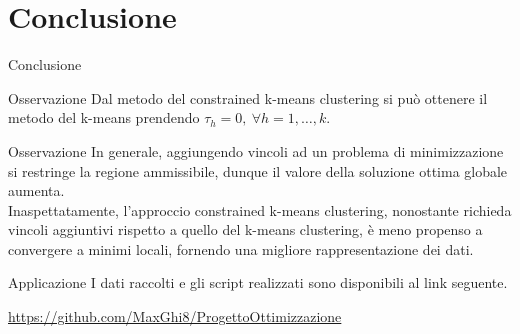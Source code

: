 \documentclass{beamer}
\begin{document}
\section{Conclusione}
\begin{frame}{Conclusione}
	\begin{exampleblock}{Osservazione}
		Dal metodo del constrained k-means clustering si può ottenere il metodo del k-means prendendo $\tau_h=0, \ \forall h=1,\dots,k$.
	\end{exampleblock}
	\begin{exampleblock}{Osservazione}
		In generale, aggiungendo vincoli ad un problema di minimizzazione si restringe la regione ammissibile, dunque il valore della soluzione ottima globale aumenta.\\
		Inaspettatamente, l'approccio constrained k-means clustering, nonostante richieda vincoli aggiuntivi rispetto a quello del k-means clustering, è meno propenso a convergere a minimi locali, fornendo una migliore rappresentazione dei dati.
	\end{exampleblock}
\end{frame}
\begin{frame}{Applicazione}
	I dati raccolti e gli script realizzati sono disponibili al link seguente.
	\begin{center}
		\url{https://github.com/MaxGhi8/ProgettoOttimizzazione}
	\end{center}
	 
\end{frame}
\end{document}
